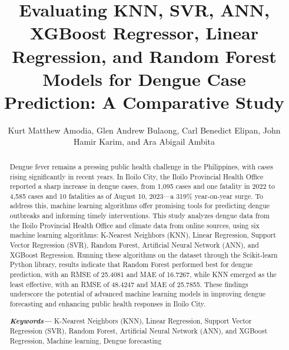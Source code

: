 \documentclass[runningheads]{llncs}
\providecommand{\keywords}[1]
{
  \small	
  \textbf{\textit{Keywords---}} #1
}
\begin{document}
\title{Evaluating KNN, SVR, ANN, XGBoost Regressor, Linear Regression, and Random Forest Models for Dengue Case Prediction: A Comparative Study}
%
%
\author{Kurt Matthew Amodia, Glen Andrew Bulaong, Carl Benedict Elipan, John Hamir Karim, and Ara Abigail Ambita}
%

\maketitle  

\begin{abstract}
Dengue fever remains a pressing public health challenge in the Philippines, with cases rising significantly in recent years. In Iloilo City, the Iloilo Provincial Health Office reported a sharp increase in dengue cases, from 1,095 cases and one fatality in 2022 to 4,585 cases and 10 fatalities as of August 10, 2023—a 319\% year-on-year surge. To address this, machine learning algorithms offer promising tools for predicting dengue outbreaks and informing timely interventions. This study analyzes dengue data from the Iloilo Provincial Health Office and climate data from online sources, using six machine learning algorithms: K-Nearest Neighbors (KNN), Linear Regression, Support Vector Regression (SVR), Random Forest, Artificial Neural Network (ANN), and XGBoost Regression. Running these algorithms on the dataset through the Scikit-learn Python library, results indicate that Random Forest performed best for dengue prediction, with an RMSE of 25.4081 and MAE of 16.7267, while KNN emerged as the least effective, with an RMSE of 48.4247 and MAE of 25.7855. These findings underscore the potential of advanced machine learning models in improving dengue forecasting and enhancing public health responses in Iloilo City.

\keywords{K-Nearest Neighbors (KNN), Linear Regression, Support Vector Regression (SVR), Random Forest, Artificial Neural Network (ANN), and XGBoost Regression, Machine learning, Dengue forecasting }
\end{abstract}
\end{document}
